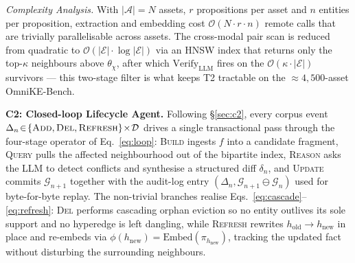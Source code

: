 \documentclass{article}
\begin{document}
\textit{Complexity Analysis.} With $|\mathcal{A}|\!=\!N$ assets, $r$ propositions per asset and $n$ entities per proposition, extraction and embedding cost $\mathcal{O}(N\!\cdot\!r\!\cdot\!n)$ remote calls that are trivially parallelisable across assets. The cross-modal pair scan is reduced from quadratic to $\mathcal{O}(|\mathcal{E}|\!\cdot\!\log|\mathcal{E}|)$ via an HNSW index that returns only the top-$\kappa$ neighbours above $\theta_{\chi}$, after which $\mathrm{Verify}_{\mathrm{LLM}}$ fires on the $\mathcal{O}(\kappa\!\cdot\!|\mathcal{E}|)$ survivors --- this two-stage filter is what keeps T2 tractable on the $\approx\!4{,}500$-asset OmniKE-Bench.

\textbf{C2: Closed-loop Lifecycle Agent.} Following \S\ref{sec:c2}, every corpus event $\Delta_n\!\in\!\{\textsc{Add},\textsc{Del},\textsc{Refresh}\}\!\times\!\mathcal{D}$ drives a single transactional pass through the four-stage operator of Eq.~\eqref{eq:loop}: \textsc{Build} ingests $f$ into a candidate fragment, \textsc{Query} pulls the affected neighbourhood out of the bipartite index, \textsc{Reason} asks the LLM to detect conflicts and synthesise a structured diff $\delta_n$, and \textsc{Update} commits $\mathcal{G}_{n+1}$ together with the audit-log entry $(\Delta_n,\mathcal{G}_{n+1}\!\ominus\!\mathcal{G}_n)$ used for byte-for-byte replay. The non-trivial branches realise Eqs.~\eqref{eq:cascade}--\eqref{eq:refresh}: \textsc{Del} performs cascading orphan eviction so no entity outlives its sole support and no hyperedge is left dangling, while \textsc{Refresh} rewrites $h_{\mathrm{old}}\!\to\!h_{\mathrm{new}}$ in place and re-embeds via $\phi(h_{\mathrm{new}})\!=\!\mathrm{Embed}(\pi_{h_{\mathrm{new}}})$, tracking the updated fact without disturbing the surrounding neighbours.
\end{document}
